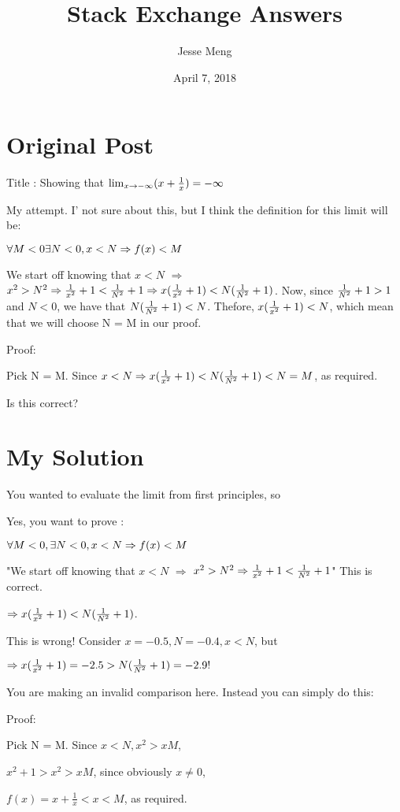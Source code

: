 \documentclass{article}
\title{Stack Exchange Answers}
\author{Jesse Meng }
\date{April 7, 2018}
\begin{document}
\maketitle

\section{Original Post}
Title : Showing that $\lim_{x \to -\infty}(x+{1\over x}) = -\infty$

My attempt. I' not sure about this, but I think the definition for this limit will be: 

$\forall M <0 \space \exists N < 0, \space x < N \Rightarrow f(x) < M$

We start off knowing that $x < N$ $\Rightarrow$ $x^2 > N^2\Rightarrow {1\over x^2 } + 1 < {1 \over N^2} + 1 \Rightarrow x({1\over x^2 } + 1) < N({1 \over N^2} + 1)$. Now, since ${1\over N^2} + 1 > 1$ and $N < 0$, we have that $N({1\over N^2} + 1 ) < N$. Thefore, $x({1\over x^2} + 1) < N$, which mean that we will choose N = M in our proof.

Proof:

Pick N = M. Since $x < N \Rightarrow x({1\over x^2 } + 1) < N({1 \over N^2} + 1)< N = M$, as required. 

Is this correct?
\section{My Solution}
You wanted to evaluate the limit from first principles, so

Yes, you want to prove :

$\forall M <0,\space \exists N < 0, \space x < N \Rightarrow f(x) < M$


"We start off knowing that $x < N$ $\Rightarrow$ $x^2 > N^2\Rightarrow {1\over x^2 } + 1 < {1 \over N^2} + 1$" This is correct.

$\Rightarrow x({1\over x^2 } + 1) < N({1 \over N^2} + 1)$.

This is wrong! Consider $x=-0.5,N=-0.4,x<N$, but 

$\Rightarrow x({1\over x^2 } + 1)=-2.5 > N({1 \over N^2} + 1)=-2.9!$

You are making an invalid comparison here.
Instead you can simply do this:

Proof:

Pick N = M. Since $x < N,x^2>xM$,

$x^2+1>x^2>xM$, since obviously $x\neq 0$,

$f(x)=x+\frac{1}{x}<x<M$, as required.
\end{document}
